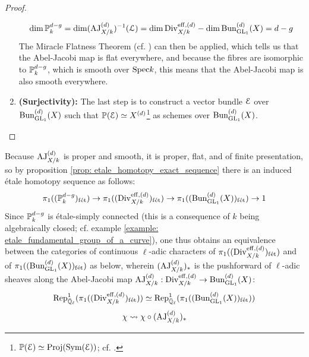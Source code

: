 \begin{proof}
\begin{enumerate}
                            $$\dim \P^{d - g}_k = \dim (\AJ_{X/k}^{(d)})^{-1}(\calL) = \dim \Div_{X/k}^{\eff, (d)} - \dim \Bun_{\GL_1}^{(d)}(X) = d - g$$
                        The Miracle Flatness Theorem (cf. \cite[\href{https://stacks.math.columbia.edu/tag/00R4}{Tag 00R4}]{stacks}) can then be applied, which tells us that the Abel-Jacobi map is flat everywhere, and because the fibres are isomorphic to $\P^{d - g}_k$, which is smooth over $\Spec k$, this means that the Abel-Jacobi map is also smooth everywhere.
                        \item \textbf{(Surjectivity):} The last step is to construct a vector bundle $\E$ over $\Bun_{\GL_1}^{(d)}(X)$ such that $\P(\E) \cong X^{(d)}$\footnote{$\P(\E) \cong \Proj(\Sym(\E))$; cf. \cite[\href{https://stacks.math.columbia.edu/tag/01OA}{Tag 01OA}]{stacks}.} as schemes over $\Bun_{\GL_1}^{(d)}(X)$. 
                    \end{enumerate}
            \end{proof}
        \begin{corollary} \label{coro: galois_representations_induced_by_the_abel_jacobi_map}
            Because $\AJ_{X/k}^{(d)}$ is proper and smooth, it is proper, flat, and of finite presentation, so by proposition \ref{prop: etale_homotopy_exact_sequence} there is an induced \'etale homotopy sequence as follows:
                $$\pi_1((\P^{d - g}_k)_{\fet}) \to \pi_1((\Div_{X/k}^{\eff, (d)})_{\fet}) \to \pi_1((\Bun_{\GL_1}^{(d)}(X))_{\fet}) \to 1$$
            Since $\P^{d - g}_k$ is \'etale-simply connected (this is a consequence of $k$ being algebraically closed; cf. example \ref{example: etale_fundamental_group_of_a_curve}), one thus obtains an equivalence between the categories of continuous $\ell$-adic characters of $\pi_1((\Div_{X/k}^{\eff, (d)})_{\fet})$ and of $\pi_1((\Bun_{\GL_1}^{(d)}(X))_{\fet})$ as below, wherein $(\AJ_{X/k}^{(d)})_*$ is the pushforward of $\ell$-adic sheaves along the Abel-Jacobi map $\AJ_{X/k}^{(d)}: \Div_{X/k}^{\eff, (d)} \to \Bun_{\GL_1}^{(d)}(X)$:
                $$\Rep^1_{\bar{\Q}_{\ell}}(\pi_1((\Div_{X/k}^{\eff, (d)})_{\fet})) \cong \Rep^1_{\bar{\Q}_{\ell}}(\pi_1((\Bun_{\GL_1}^{(d)}(X))_{\fet}))$$
                $$\chi \mapsto \chi \circ (\AJ_{X/k}^{(d)})_*$$
        \end{corollary}
    
